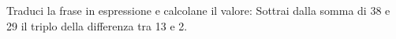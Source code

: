 \item Traduci la frase in espressione e calcolane il valore: Sottrai dalla somma di 38 e 29 il triplo della differenza tra 13 e 2.